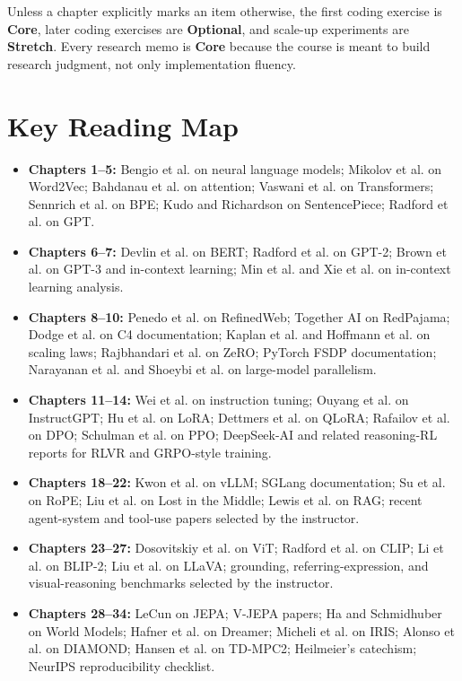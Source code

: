 \documentclass[11pt]{article}
\begin{document}
Unless a chapter explicitly marks an item otherwise, the first coding exercise is \textbf{Core}, later coding exercises are \textbf{Optional}, and scale-up experiments are \textbf{Stretch}. Every research memo is \textbf{Core} because the course is meant to build research judgment, not only implementation fluency.

\section*{Key Reading Map}

\begin{itemize}
    \item \textbf{Chapters 1--5:} Bengio et al. on neural language models; Mikolov et al. on Word2Vec; Bahdanau et al. on attention; Vaswani et al. on Transformers; Sennrich et al. on BPE; Kudo and Richardson on SentencePiece; Radford et al. on GPT.
    \item \textbf{Chapters 6--7:} Devlin et al. on BERT; Radford et al. on GPT-2; Brown et al. on GPT-3 and in-context learning; Min et al. and Xie et al. on in-context learning analysis.
    \item \textbf{Chapters 8--10:} Penedo et al. on RefinedWeb; Together AI on RedPajama; Dodge et al. on C4 documentation; Kaplan et al. and Hoffmann et al. on scaling laws; Rajbhandari et al. on ZeRO; PyTorch FSDP documentation; Narayanan et al. and Shoeybi et al. on large-model parallelism.
    \item \textbf{Chapters 11--14:} Wei et al. on instruction tuning; Ouyang et al. on InstructGPT; Hu et al. on LoRA; Dettmers et al. on QLoRA; Rafailov et al. on DPO; Schulman et al. on PPO; DeepSeek-AI and related reasoning-RL reports for RLVR and GRPO-style training.
    \item \textbf{Chapters 18--22:} Kwon et al. on vLLM; SGLang documentation; Su et al. on RoPE; Liu et al. on Lost in the Middle; Lewis et al. on RAG; recent agent-system and tool-use papers selected by the instructor.
    \item \textbf{Chapters 23--27:} Dosovitskiy et al. on ViT; Radford et al. on CLIP; Li et al. on BLIP-2; Liu et al. on LLaVA; grounding, referring-expression, and visual-reasoning benchmarks selected by the instructor.
    \item \textbf{Chapters 28--34:} LeCun on JEPA; V-JEPA papers; Ha and Schmidhuber on World Models; Hafner et al. on Dreamer; Micheli et al. on IRIS; Alonso et al. on DIAMOND; Hansen et al. on TD-MPC2; Heilmeier's catechism; NeurIPS reproducibility checklist.
\end{itemize}
\end{document}
